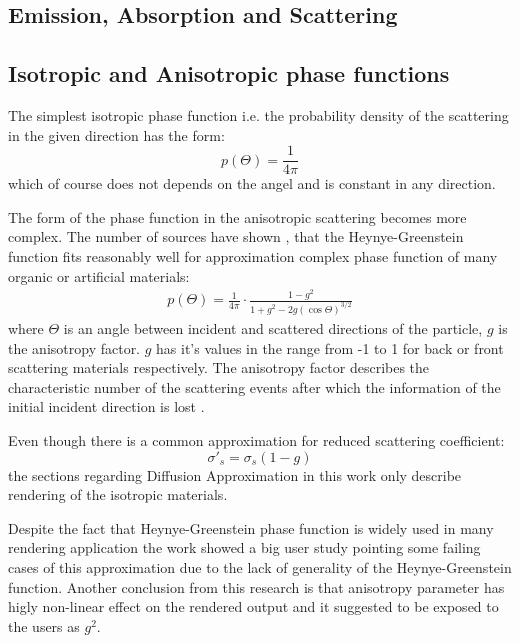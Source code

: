 \subsection{Emission, Absorption and Scattering}

\subsection{Isotropic and Anisotropic phase functions}
\label{section:phasefunction}

The simplest isotropic phase function i.e. the probability density of the scattering in the given
direction has the form:
\[
p(\Theta) = \frac{1}{4\pi}
\]
which of course does not depends on the angel and is constant in any direction.

The form of the phase function in the anisotropic scattering becomes more complex. The number of
sources have shown \cite{0031-9155-51-17-N04}, \cite{Gkioulekas:2013:URP:2516971.2516972} that the
Heynye-Greenstein function fits reasonably well for approximation complex phase function of many
organic or artificial materials:
\begin{align}
\label{eq:hg_pdf_theory}
p(\Theta) = \frac{1}{4\pi}\cdot\frac{1-g^2}{1+g^2-2g(\cos{\Theta})^{3/2}}
\end{align}
where $\Theta$ is an angle between incident and scattered directions of the particle, $g$ is the
anisotropy factor. $g$ has it's values in the range from -1 to 1 for back or front scattering
materials respectively. The anisotropy factor describes the characteristic number of the scattering
events after which the information of the initial incident direction is lost
\cite{wang2007biomedical}.

Even though there is a common approximation for reduced scattering coefficient:
\[
\sigma\prime_s = \sigma_s(1 - g)
\]
the sections regarding Diffusion Approximation in this work only describe rendering of the isotropic
materials.

Despite the fact that Heynye-Greenstein phase function is widely used in many rendering application
the work \cite{Gkioulekas:2013:IVR:2508363.2508377} showed a big user study pointing some failing
cases of this approximation due to the lack of generality of the Heynye-Greenstein function. Another
conclusion from this research is that anisotropy parameter has higly non-linear effect on the
rendered output and it suggested to be exposed to the users as $g^2$.

